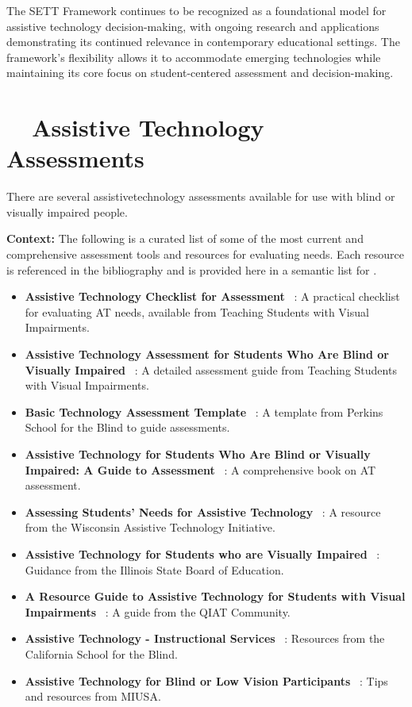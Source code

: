 The SETT Framework continues to be recognized as a foundational model for assistive technology decision-making, with ongoing research and applications demonstrating its continued relevance in contemporary educational settings. The framework's flexibility allows it to accommodate emerging technologies while maintaining its core focus on student-centered assessment and decision-making.

\section{~~Assistive Technology Assessments}\label{app3:trouble4}
There are several \gls{assistivetechnology} assessments available for use with blind or visually impaired people.

\noindent
\textbf{Context:} The following is a curated list of some of the most current and comprehensive assessment tools and resources for evaluating  needs. Each resource is referenced in the bibliography and is provided here in a semantic list for .

\begin{itemize}
	\item \textbf{Assistive Technology Checklist for Assessment}~ \supercite{SnowChecklist}: A practical checklist for evaluating AT needs, available from Teaching Students with Visual Impairments.
	\item \textbf{Assistive Technology Assessment for Students Who Are Blind or Visually Impaired}~ \supercite{TeachingAssessment}: A detailed assessment guide from Teaching Students with Visual Impairments.
	\item \textbf{Basic Technology Assessment Template}~ \supercite{PerkinsTemplate}: A template from Perkins School for the Blind to guide  assessments.
	\item \textbf{Assistive Technology for Students Who Are Blind or Visually Impaired: A Guide to Assessment}~ \supercite{PresleyGuide}: A comprehensive book on AT assessment.
	\item \textbf{Assessing Students' Needs for Assistive Technology}~ \supercite{WATIAssessing}: A resource from the Wisconsin Assistive Technology Initiative.
	\item \textbf{Assistive Technology for Students who are Visually Impaired}~ \supercite{ISBEAssistive}: Guidance from the Illinois State Board of Education.
	\item \textbf{A Resource Guide to Assistive Technology for Students with Visual Impairments}~ \supercite{QIATGuide}: A guide from the QIAT Community.
	\item \textbf{Assistive Technology - Instructional Services}~ \supercite{CSBInstruction}: Resources from the California School for the Blind.
	\item \textbf{Assistive Technology for Blind or Low Vision Participants}~ \supercite{MIUSATips}: Tips and resources from MIUSA.
\end{itemize}

